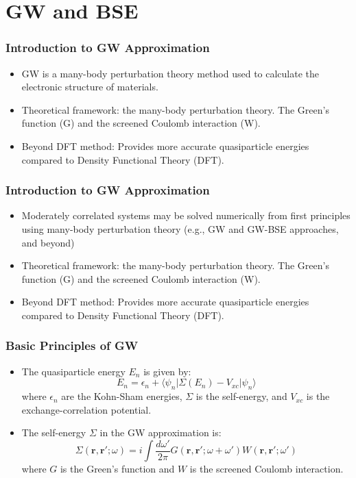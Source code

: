 \documentclass{CustomBeamer}
\begin{document}
    \section{GW and BSE}
    \begin{frame}
        \frametitle{Introduction to GW Approximation}
        \begin{itemize}
            \item GW is a many-body perturbation theory method used to calculate the electronic structure of materials.
            \item Theoretical framework: the many-body perturbation theory. The Green's function (G) and the screened Coulomb interaction (W).
            \item Beyond DFT method: Provides more accurate quasiparticle energies compared to Density Functional Theory (DFT).
        \end{itemize}
        \end{frame}

        \begin{frame}
            \frametitle{Introduction to GW Approximation}
            \begin{itemize}
                \item         Moderately correlated systems may be solved numerically
                from first principles using many-body perturbation theory
                (e.g., GW and GW-BSE approaches, and beyond)                \item Theoretical framework: the many-body perturbation theory. The Green's function (G) and the screened Coulomb interaction (W).
                \item Beyond DFT method: Provides more accurate quasiparticle energies compared to Density Functional Theory (DFT).
            \end{itemize}
            \end{frame}


        \begin{frame}
        \frametitle{Basic Principles of GW}
        \begin{itemize}
            \item The quasiparticle energy $E_n$ is given by:
            \begin{equation}
            E_n = \epsilon_n + \langle \psi_n | \Sigma(E_n) - V_{xc} | \psi_n \rangle
            \end{equation}
            where $\epsilon_n$ are the Kohn-Sham energies, $\Sigma$ is the self-energy, and $V_{xc}$ is the exchange-correlation potential.
            \item The self-energy $\Sigma$ in the GW approximation is:
            \begin{equation}
            \Sigma(\mathbf{r}, \mathbf{r}'; \omega) = i \int \frac{d\omega'}{2\pi} G(\mathbf{r}, \mathbf{r}'; \omega + \omega') W(\mathbf{r}, \mathbf{r}'; \omega')
            \end{equation}
            where $G$ is the Green's function and $W$ is the screened Coulomb interaction.
        \end{itemize}
        \end{frame}
        
\end{document}
